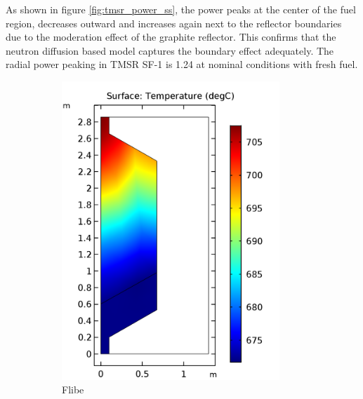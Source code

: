 \documentclass{elsarticle}
\begin{document}
As shown in figure \ref{fig:tmsr_power_ss}, the power peaks at the center of the fuel region, decreases outward and increases again next to the reflector boundaries due to the moderation effect of the graphite reflector. This confirms that the neutron diffusion based model captures the boundary effect adequately. The radial power peaking in TMSR SF-1 is 1.24 at nominal conditions with fresh fuel.

 

\begin{figure}[h]
  \centering
    \begin{subfigure}[b]{0.3\textwidth}
        \centering
        \includegraphics[width=0.9\textwidth]{./images/diffusion/tmsr/SS/non_ms/T_flibe(steady_state).png}
        \caption{Flibe}
    \end{subfigure}%
    ~
    \begin{subfigure}[b]{0.3\textwidth}
        \centering

\end{subfigure}
\end{figure}
\end{document}
